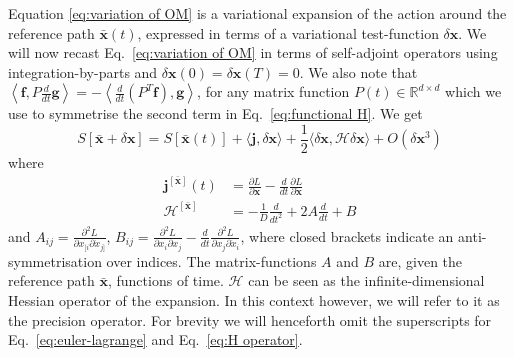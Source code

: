 Equation \ref{eq:variation of OM} is a variational expansion of the action around the reference path $\mathbf{\bar{\mathbf{x}}}(t)$, expressed in terms of a variational test-function $\delta \mathbf{x}$. We will now recast Eq.~\ref{eq:variation of OM}
in terms of self-adjoint operators using integration-by-parts and
$\delta\mathbf{x}(0)=\delta\mathbf{x}(T)=0$. We also note that $\left\langle \mathbf{f},P\frac{d}{dt}\mathbf{g}\right\rangle =-\left\langle \frac{d}{dt}\left(P^{T}\mathbf{f}\right),\mathbf{g}\right\rangle $,
for any matrix function $P(t)\in\mathbb{R}^{d\times d}$
which we use to symmetrise the second term in Eq.~\ref{eq:functional H}. We get
\begin{equation}
S[\bar{\mathbf{x}}+\delta\mathbf{x}]=S[\bar{\mathbf{x}}(t)]+\langle\mathbf{j},\delta\mathbf{x}\rangle+\frac{1}{2}\langle\delta\mathbf{x},\mathcal{H}\delta\mathbf{x}\rangle+O(\delta\mathbf{x}^{3})\label{eq:OM expansion in operator form}
\end{equation}
where
\begin{align}
\mathbf{j}^{[\bar{\mathbf{x}}]}(t) & =\frac{\partial L}{\partial\mathbf{x}}-\frac{d}{dt}\frac{\partial L}{\partial\dot{\mathbf{x}}} \label{eq:euler-lagrange}\\
\mathcal{H}^{[\bar{\mathbf{x}}]} & =-\frac{1}{D} \frac{d}{dt^{2}}+2A\frac{d}{dt}+B \label{eq:H operator}
\end{align}
and $A_{ij}=\frac{\partial^{2}L}{\partial x_{[i}\partial\dot{x}_{j]}}$,
$B_{ij}=\frac{\partial^{2}L}{\partial x_{i}\partial x_{j}}-\frac{d}{dt}\frac{\partial^{2}L}{\partial x_{j}\partial\dot{x}_{i}}$,
where closed brackets indicate an anti-symmetrisation over indices. The matrix-functions $A$ and $B$ are, given the reference path $\bar{\mathbf{x}}$, functions of time. $\mathcal{H}$ can be seen as the infinite-dimensional Hessian operator of the expansion. In this context however, we will refer to it as the precision operator. For brevity we will henceforth omit the superscripts for Eq.~\ref{eq:euler-lagrange} and Eq.~\ref{eq:H operator}.

